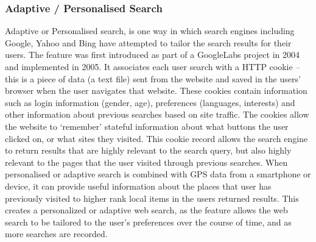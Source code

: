 \documentclass[10pt]{article}
\begin{document}
\subsubsection{Adaptive / Personalised Search}
Adaptive or Personalised search, is one way in which search engines including Google, Yahoo and Bing have attempted to tailor the search results for their users. The feature was first introduced as part of a GoogleLabs project in 2004 and implemented in 2005. It associates each user search with a HTTP cookie – this is a piece of data (a text file) sent from the website and saved in the users’ browser when the user navigates that website. These cookies contain information such as login information (gender, age), preferences (languages, interests) and other information about previous searches based on site traffic. The cookies allow the website to ‘remember’ stateful information about what buttons the user clicked on, or what sites they visited. This cookie record allows the search engine to return results that are highly relevant to the search query, but also highly relevant to the pages that the user visited through previous searches. When personalised or adaptive search is combined with GPS data from a smartphone or device, it can provide useful information about the places that user has previously visited to higher rank local items in the users returned results. This creates a personalized or adaptive web search, as the feature allows the web search to be tailored to the user’s preferences over the course of time, and as more searches are recorded.
\end{document}
